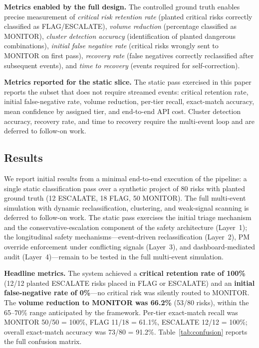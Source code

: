 \documentclass[runningheads]{llncs}
\begin{document}
\textbf{Metrics enabled by the full design.} The controlled ground truth enables precise measurement of \emph{critical risk retention rate} (planted critical risks correctly classified as FLAG/ESCALATE), \emph{volume reduction} (percentage classified as MONITOR), \emph{cluster detection accuracy} (identification of planted dangerous combinations), \emph{initial false negative rate} (critical risks wrongly sent to MONITOR on first pass), \emph{recovery rate} (false negatives correctly reclassified after subsequent events), and \emph{time to recovery} (events required for self-correction).

\textbf{Metrics reported for the static slice.} The static pass exercised in this paper reports the subset that does not require streamed events: critical retention rate, initial false-negative rate, volume reduction, per-tier recall, exact-match accuracy, mean confidence by assigned tier, and end-to-end API cost. Cluster detection accuracy, recovery rate, and time to recovery require the multi-event loop and are deferred to follow-on work.

\subsection{Results}
\label{sec:results}

We report initial results from a minimal end-to-end execution of the pipeline: a single static classification pass over a synthetic project of 80 risks with planted ground truth (12 ESCALATE, 18 FLAG, 50 MONITOR). The full multi-event simulation with dynamic reclassification, clustering, and weak-signal scanning is deferred to follow-on work. The static pass exercises the initial triage mechanism and the conservative-escalation component of the safety architecture (Layer~1); the longitudinal safety mechanisms---event-driven reclassification (Layer~2), PM override enforcement under conflicting signals (Layer~3), and dashboard-mediated audit (Layer~4)---remain to be tested in the full multi-event simulation.

\textbf{Headline metrics.} The system achieved a \textbf{critical retention rate of 100\%} (12/12 planted ESCALATE risks placed in FLAG or ESCALATE) and an \textbf{initial false-negative rate of 0\%}---no critical risk was silently routed to MONITOR. The \textbf{volume reduction to MONITOR was 66.2\%} (53/80 risks), within the 65--70\% range anticipated by the framework. Per-tier exact-match recall was MONITOR 50/50 = 100\%, FLAG 11/18 = 61.1\%, ESCALATE 12/12 = 100\%; overall exact-match accuracy was 73/80 = 91.2\%. Table~\ref{tab:confusion} reports the full confusion matrix.
\end{document}
